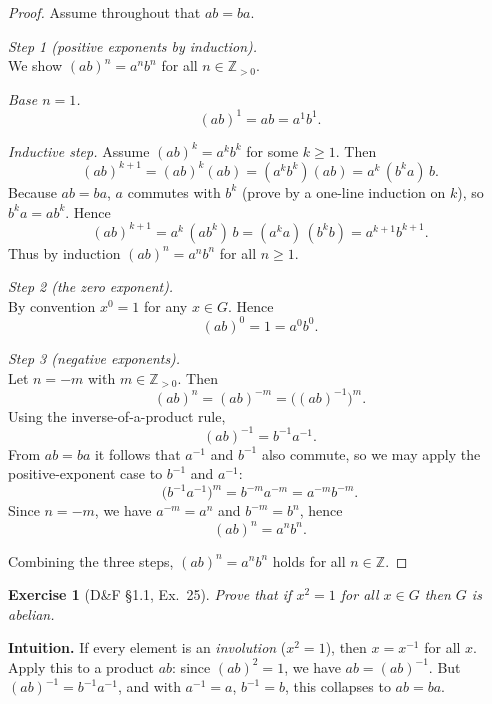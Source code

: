 \documentclass[12pt]{article}
\newtheorem{exercise}[theorem]{Exercise}
\theoremstyle{definition}
\begin{document}
\dotfill

\begin{proof}
Assume throughout that $ab=ba$.

\dotfill

\noindent\emph{Step 1 (positive exponents by induction).}\\

\noindent
We show $(ab)^n=a^n b^n$ for all $n\in\mathbb{Z}_{>0}$.

\noindent
\emph{Base $n=1$.}
\[
(ab)^1=ab=a^1 b^1.
\]

\noindent
\emph{Inductive step.}
Assume $(ab)^k=a^k b^k$ for some $k\ge 1$. Then
\[
(ab)^{k+1}=(ab)^k(ab)=(a^k b^k)(ab)=a^k\,(b^k a)\,b.
\]
Because $ab=ba$, $a$ commutes with $b^k$ (prove by a one-line induction on $k$), so $b^k a=a b^k$. Hence
\[
(ab)^{k+1}=a^k\,(a b^k)\,b=(a^k a)\,(b^k b)=a^{k+1} b^{k+1}.
\]
Thus by induction $(ab)^n=a^n b^n$ for all $n\ge 1$.

\dotfill

\noindent\emph{Step 2 (the zero exponent).}\\

\noindent
By convention $x^0=1$ for any $x\in G$. Hence
\[
(ab)^0=1=a^0 b^0.
\]

\dotfill

\noindent\emph{Step 3 (negative exponents).}\\

\noindent
Let $n=-m$ with $m\in\mathbb{Z}_{>0}$. Then
\[
(ab)^n=(ab)^{-m}=\bigl((ab)^{-1}\bigr)^{m}.
\]
Using the inverse-of-a-product rule,
\[
(ab)^{-1}=b^{-1}a^{-1}.
\]
From $ab=ba$ it follows that $a^{-1}$ and $b^{-1}$ also commute, so we may apply the positive-exponent case to $b^{-1}$ and $a^{-1}$:
\[
\bigl(b^{-1}a^{-1}\bigr)^{m}=b^{-m}a^{-m}=a^{-m}b^{-m}.
\]
Since $n=-m$, we have $a^{-m}=a^{n}$ and $b^{-m}=b^{n}$, hence
\[
(ab)^n=a^{n}b^{n}.
\]

\dotfill

\noindent
Combining the three steps, $(ab)^n=a^n b^n$ holds for all $n\in\mathbb{Z}$.
\end{proof}

\newpage

\begin{exercise}[D\&F §1.1, Ex.~25]
Prove that if $x^2=1$ for all $x\in G$ then $G$ is abelian.
\end{exercise}

\dotfill

\noindent
\textbf{Intuition.}
If every element is an \emph{involution} ($x^2=1$), then $x=x^{-1}$ for all $x$.
Apply this to a product $ab$: since $(ab)^2=1$, we have $ab=(ab)^{-1}$.
But $(ab)^{-1}=b^{-1}a^{-1}$, and with $a^{-1}=a$, $b^{-1}=b$, this collapses to $ab=ba$.
\end{document}
